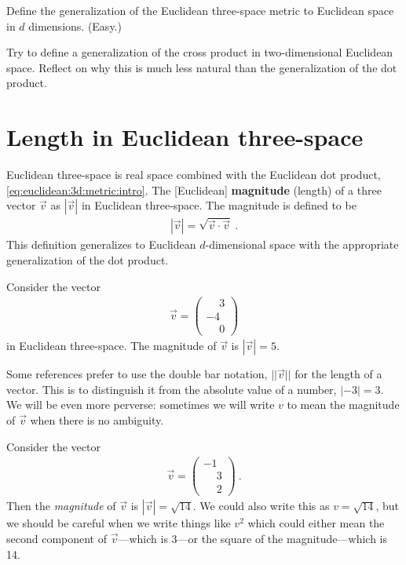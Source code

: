 \begin{exercise}
Define the generalization of the Euclidean three-space metric to Euclidean space in $d$ dimensions. (Easy.)
\end{exercise}

\begin{exercise}
Try to define a generalization of the cross product in two-dimensional Euclidean space. Reflect on why this is much less natural than the generalization of the dot product. 
\end{exercise}



\section{Length in Euclidean three-space}
\label{sec:Euclidean:three:length}

Euclidean three-space is real space combined with the Euclidean dot product, \eqref{eq:euclidean:3d:metric:intro}. The [Euclidean] \textbf{magnitude} (length) of a three vector $\vec{v}$ as $|\vec{v}|$ in Euclidean three-space. The magnitude is defined to be
\begin{align}
    |\vec{v}| = \sqrt{\vec{v}\cdot\vec{v}} \ .
\end{align}
This definition generalizes to Euclidean $d$-dimensional space with the appropriate generalization of the dot product.

\begin{example}
Consider the vector
\begin{align}
    \vec{v} = 
    \begin{pmatrix}
    \phantom{+}3\\-4\\\phantom{+}0    
    \end{pmatrix}
\end{align}
in Euclidean three-space. The magnitude of $\vec{v}$ is $|\vec{v}| = 5$.
\end{example}


Some references prefer to use the double bar notation, $||\vec{v}||$ for the length of a vector. This is to distinguish it from the absolute value of a number, $|-3| = 3$. We will be even more perverse: sometimes we will write $v$ to mean the magnitude of $\vec{v}$ when there is no ambiguity.

\begin{example}
Consider the vector
\begin{align}
    \vec{v} = 
    \begin{pmatrix}
    -1\\ \phantom{+}3\\ \phantom{+}2
    \end{pmatrix} \ .
\end{align}
Then the \emph{magnitude} of $\vec{v}$ is $|\vec{v}|=\sqrt{14}$. We could also write this as $v = \sqrt{14}$, but we should be careful when we write things like $v^2$ which could either mean the second component of $\vec{v}$---which is $3$---or the square of the magnitude---which is 14. 
\end{example}


